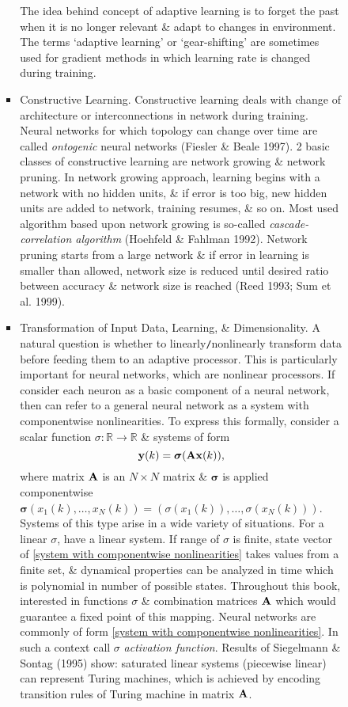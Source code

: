 \documentclass{article}
\begin{document}
\begin{enumerate}
\begin{itemize}
\begin{itemize}
\begin{itemize}
				The idea behind concept of adaptive learning is to forget the past when it is no longer relevant \& adapt to changes in environment. The terms `adaptive learning' or `gear-shifting' are sometimes used for gradient methods in which learning rate is changed during training.
				\item {\sf Constructive Learning.} Constructive learning deals with change of architecture or interconnections in network during training. Neural networks for which topology can change over time are called {\it ontogenic} neural networks (Fiesler \& Beale 1997). 2 basic classes of constructive learning are network growing \& network pruning. In network growing approach, learning begins with a network with no hidden units, \& if error is too big, new hidden units are added to network, training resumes, \& so on. Most used algorithm based upon network growing is so-called {\it cascade-correlation algorithm} (Hoehfeld \& Fahlman 1992). Network pruning starts from a large network \& if error in learning is smaller than allowed, network size is reduced until desired ratio between accuracy \& network size is reached (Reed 1993; Sum et al. 1999).
				\item {\sf Transformation of Input Data, Learning, \& Dimensionality.} A natural question is whether to linearly{\tt/}nonlinearly transform data before feeding them to an adaptive processor. This is particularly important for neural networks, which are nonlinear processors. If consider each neuron as a basic component of a neural network, then can refer to a general neural network as a system with componentwise nonlinearities. To express this formally, consider a scalar function $\sigma:\mathbb{R}\to\mathbb{R}$ \& systems of form
				\begin{equation}
					\label{system with componentwise nonlinearities}
					{\bf y}(k) = \boldsymbol{\sigma}({\bf A}{\bf x}(k)),
				\end{equation}
				where matrix ${\bf A}$ is an $N\times N$ matrix \& $\boldsymbol{\sigma}$ is applied componentwise $\boldsymbol{\sigma}(x_1(k),\ldots,x_N(k)) = (\sigma(x_1(k)),\ldots,\sigma(x_N(k)))$. Systems of this type arise in a wide variety of situations. For a linear $\sigma$, have a linear system. If range of $\sigma$ is finite, state vector of \eqref{system with componentwise nonlinearities} takes values from a finite set, \& dynamical properties can be analyzed in time which is polynomial in number of possible states. Throughout this book, interested in functions $\sigma$ \& combination matrices ${\bf A}$ which would guarantee a fixed point of this mapping. Neural networks are commonly of form \eqref{system with componentwise nonlinearities}. In such a context call $\sigma$ {\it activation function}. Results of Siegelmann \& Sontag (1995) show: saturated linear systems (piecewise linear) can represent Turing machines, which is achieved by encoding transition rules of Turing machine in matrix ${\bf A}$.
				

\end{itemize}
\end{itemize}
\end{itemize}
\end{enumerate}
\end{document}
